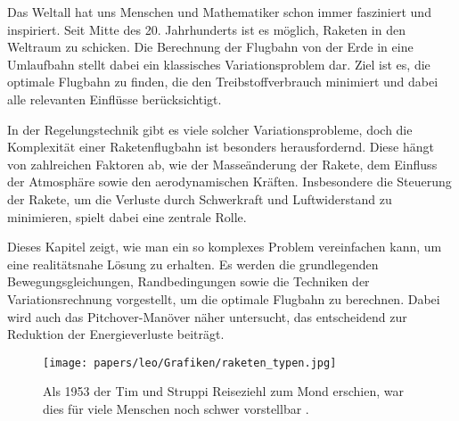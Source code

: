 %
%
%
%

Das Weltall hat uns Menschen und Mathematiker schon immer fasziniert und inspiriert. 
Seit Mitte des 20. Jahrhunderts ist es möglich, Raketen in den Weltraum zu schicken. 
Die Berechnung der Flugbahn von der Erde in eine Umlaufbahn stellt dabei ein klassisches Variationsproblem dar. 
Ziel ist es, die optimale Flugbahn zu finden, die den Treibstoffverbrauch minimiert und dabei alle relevanten Einflüsse berücksichtigt.

In der Regelungstechnik gibt es viele solcher Variationsprobleme, doch die Komplexität einer Raketenflugbahn ist besonders herausfordernd. 
Diese hängt von zahlreichen Faktoren ab, wie der Masseänderung der Rakete, dem Einfluss der Atmosphäre sowie den aerodynamischen Kräften. 
Insbesondere die Steuerung der Rakete, um die Verluste durch Schwerkraft und Luftwiderstand zu minimieren, spielt dabei eine zentrale Rolle.

Dieses Kapitel zeigt, wie man ein so komplexes Problem vereinfachen kann, um eine realitätsnahe Lösung zu erhalten. 
Es werden die grundlegenden Bewegungsgleichungen, Randbedingungen sowie die Techniken der Variationsrechnung vorgestellt, um die optimale Flugbahn zu berechnen. 
Dabei wird auch das Pitchover-Manöver näher untersucht, das entscheidend zur Reduktion der Energieverluste beiträgt. 

\begin{figure}
	\centering
	\texttt{[image: papers/leo/Grafiken/raketen\_typen.jpg]}
	\caption{Als 1953 der Tim und Struppi Reiseziehl zum Mond erschien, war dies für viele Menschen noch schwer vorstellbar \cite{leo:timstruppi}.}
	\label{fig:leo:raketen_typen}
\end{figure}







